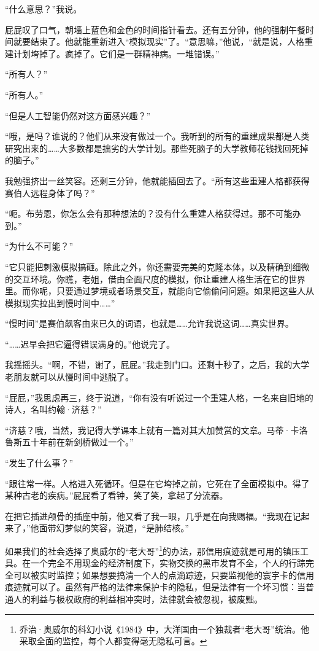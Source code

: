\documentclass[AutoFakeBold=true]{book}
\begin{document}
``什么意思？''我说。

屁屁叹了口气，朝墙上蓝色和金色的时间指针看去。还有五分钟，他的强制午餐时间就要结束了。他就能重新进入``模拟现实''了。``意思嘛，''他说，``就是说，人格重建计划垮掉了。疯掉了。它们是一群精神病。一堆错误。''

``所有人？''

``所有人。''

``但是人工智能仍然对这方面感兴趣？''

``哦，是吗？谁说的？他们从来没有做过一个。我听到的所有的重建成果都是人类研究出来的……大多数都是拙劣的大学计划。那些死脑子的大学教师花钱找回死掉的脑子。''

我勉强挤出一丝笑容。还剩三分钟，他就能插回去了。``所有这些重建人格都获得赛伯人远程身体了吗？''

``呃。布劳恩，你怎么会有那种想法的？没有什么重建人格获得过。那不可能办到。''

``为什么不可能？''

``它只能把刺激模拟搞砸。除此之外，你还需要完美的克隆本体，以及精确到细微的交互环境。你瞧，老姐，借由全面尺度的模拟，你让重建人格生活在它的世界里。而你呢，只要通过梦境或者场景交互，就能向它偷偷问问题。如果把这些人从模拟现实拉出到慢时间中……''

``慢时间''是赛伯飙客由来已久的词语，也就是……允许我说这词……真实世界。

``……迟早会把它逼得错误满身的。''他说完了。

我摇摇头。``啊，不错，谢了，屁屁。''我走到门口。还剩十秒了，之后，我的大学老朋友就可以从慢时间中逃脱了。

``屁屁，''我思虑再三，终于说道，``你有没有听说过一个重建人格，一名来自旧地的诗人，名叫约翰·济慈？''

``济慈？哦，当然，我记得大学课本上就有一篇对其大加赞赏的文章。马蒂·卡洛鲁斯五十年前在新剑桥做过一个。''

``发生了什么事？''

``跟往常一样。人格进入死循环。但是在它垮掉之前，它死在了全面模拟中。得了某种古老的疾病。''屁屁看了看钟，笑了笑，拿起了分流器。

在把它插进颅骨的插座中前，他又看了我一眼，几乎是在向我赐福。``我现在记起来了，''他面带幻梦似的笑容，说道，``是肺结核。''

\vspace*{1em}

如果我们的社会选择了奥威尔的``老大哥''\footnote{乔治·奥威尔的科幻小说《1984》中，大洋国由一个独裁者``老大哥''统治。他采取全面的监控，每个人都变得毫无隐私可言。}的办法，那信用痕迹就是可用的镇压工具。在一个完全不用现金的经济制度下，实物交换的黑市发育不全，个人的行踪完全可以被实时监控；如果想要搞清一个人的点滴踪迹，只要监视他的寰宇卡的信用痕迹就可以了。虽然有严格的法律来保护卡的隐私，但是法律有一个坏习惯：当普通人的利益与极权政府的利益相冲突时，法律就会被忽视，被废黜。
\end{document}
